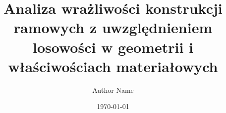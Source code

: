 \title{Analiza wrażliwości konstrukcji ramowych z uwzględnieniem losowości
w geometrii i właściwościach materiałowych}
\author{Author Name}
\date{\today}